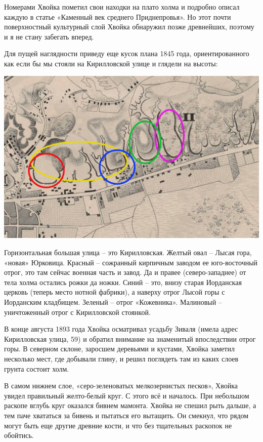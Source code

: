 Номерами Хвойка пометил свои находки на плато холма и подробно описал каждую в статье «Каменный век среднего Приднепровья». Но этот почти поверхностный культурный слой Хвойка обнаружил позже древнейших, поэтому и я не стану забегать вперед.

Для пущей наглядности приведу еще кусок плана 1845 года, ориентированного как если бы мы стояли на Кирилловской улице и глядели на высоты:

\begin{center}
\includegraphics[width=\linewidth]{chast-kirvys/kirstoy/1845-vmap.jpg}
\end{center}

Горизонтальная большая улица – это Кирилловская. Желтый овал – Лысая гора, «новая» Юрковица. Красный – сожранный кирпичным заводом ее юго-восточ\-ный отрог, это там сейчас военная часть и завод. Да и правее (северо-западнее) от тела холма остались рожки да ножки. Синий – это, внизу старая Иорданская церковь (теперь место нотной фабрики), а наверху отрог Лысой горы с Иорданским кладбищем. Зеленый – отрог «Кожевника». Малиновый – уничтоженный отрог с Кирилловской стоянкой.

В конце августа 1893 года Хвойка осматривал усадьбу Зиваля (имела адрес Кирилловская улица, 59) и обратил внимание на знаменитый впоследствии отрог горы. В северном склоне, заросшем деревьями и кустами, Хвойка заметил несколько мест, где добывали глину, и решил поглядеть там из каких слоев грунта состоит холм. 

В самом нижнем слое, «серо-зеленоватых мелкозернистых песков», Хвойка увидел правильный желто-белый круг. С этого всё и началось. При небольшом раскопе вглубь круг оказался бивнем мамонта. Хвойка не спешил рыть дальше, а тем паче хвататься за бивень и пытаться его вытащить. Он смекнул, что рядом могут быть еще другие древние кости, и что без тщательных раскопок не обойтись.


